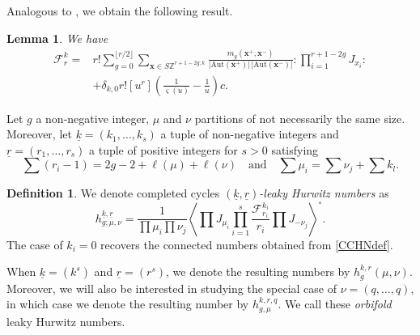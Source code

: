 \documentclass[10pt,a4paper,oneside,no-math,reqno]{amsart}%
\theoremstyle{plain}
\newtheorem{lemma}[theorem]{Lemma}
\theoremstyle{definition}
\newtheorem{definition}[theorem]{Definition}
\theoremstyle{remark}
\numberwithin{equation}{section}
\newcommand{\1}{\mathds{1}}
\newcommand{\<}{\langle}
\renewcommand{\>}{\rangle}
\begin{document}
Analogous to \cite[Lemma 3.3]{HL22}, we obtain the following result.

\begin{lemma}\label{prop-expansion}
    We have
    \begin{equation}
        \begin{split}
        \mathcal{F}_r^k
        =
        &r!\sum_{g=0}^{\lfloor r/2\rfloor} \sum_{\textbf{x}\in S\mathbb{Z}^{r+1-2g;k}} \frac{m_g(\textbf{x}^+,\textbf{x}^-)}{|\mathrm{Aut}(\textbf{x}^+)|\,|\mathrm{Aut}(\textbf{x}^-)|}\colon\prod_{i=1}^{r+1-2g} J_{x_i}\colon
        \\
        &+
        \delta_{k,0} r![u^r]\left(\frac{1}{\varsigma(u)}-\frac{1}{u}\right)c .
        \end{split}
    \end{equation}
\end{lemma}



    Let $g$ a non-negative integer, $\mu$ and $\nu$ partitions of not necessarily the same size. Moreover, let $\underline{k}=(k_1,\dots,k_s)$ a tuple of non-negative integers and $\underline{r}=(r_1,\dots,r_s)$ a tuple of positive integers for $s>0$ satisfying
    \begin{equation}
        \sum (r_i-1)
        =
        2g-2+\ell(\mu)+\ell(\nu)
        \quad
        \text{and}
        \quad
        \sum \mu_i
        =
        \sum\nu_j+\sum k_l.
    \end{equation}

\begin{definition}
    We denote completed cycles $(\underline{k},\underline{r})$\emph{-leaky Hurwitz numbers} as
    \begin{equation}
    \label{def-leaky}
        h^{\underline{k},\underline{r}}_{g;\mu,\nu}
        =
        \frac{1}{\prod\mu_i\prod\nu_j} \left\langle \prod J_{\mu_i} \prod_{i=1}^s \frac{\mathcal{F}_{r_i}^{k_i}}{r_i} \prod J_{-\nu_j} \right\rangle^\circ.
    \end{equation}
    The case of $k_i=0$ recovers the connected numbers obtained from \cref{CCHNdef}.
  
    When $\underline{k}=(k^s)$ and $\underline{r}=(r^s)$, we denote the resulting numbers by  $h_g^{k,r}(\mu,\nu)$. Moreover, we will also be interested in studying the special case of $\nu=(q,\dots,q)$, in which case we denote the resulting number by $h^{k,r,q}_{g,\mu}$. We call these \emph{orbifold} leaky Hurwitz numbers.
\end{definition}
    
\end{document}
